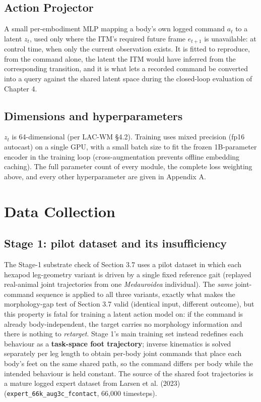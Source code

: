 \documentclass[12pt,a4paper,oneside]{report}
\begin{document}
\subsection{Action Projector}
A small per-embodiment MLP mapping a body's own logged command $a_t$ to a latent $z_t$, used only where the ITM's
required future frame $e_{t+1}$ is unavailable: at control time, when only the current observation exists. It
is fitted to reproduce, from the command alone, the latent the ITM would have inferred from the corresponding
transition, and it is what lets a recorded command be converted into a query against the shared latent space
during the closed-loop evaluation of Chapter 4.

\subsection{Dimensions and hyperparameters}
$z_t$ is 64-dimensional (per LAC-WM \S4.2). Training uses mixed precision (fp16 autocast) on a single GPU, with a
small batch size to fit the frozen 1B-parameter encoder in the training loop (cross-augmentation prevents offline
embedding caching). The full parameter count of every module, the complete loss weighting above, and every other
hyperparameter are given in Appendix A.

\section{Data Collection}

\subsection{Stage 1: pilot dataset and its insufficiency}
The Stage-1 substrate check of Section 3.7 uses a pilot dataset in which each hexapod leg-geometry variant is driven
by a single fixed reference gait (replayed real-animal joint trajectories from one \emph{Medauroidea} individual).
The \emph{same} joint-command sequence is applied to all three variants, exactly what makes the morphology-gap
test of Section 3.7 valid (identical input, different outcome), but this property is fatal for training a
latent action model on: if the command is already body-independent, the target carries no morphology information
and there is nothing to \emph{retarget}. Stage 1's main training set instead redefines each behaviour as a
\textbf{task-space foot trajectory}; inverse kinematics is solved separately per leg length to obtain
per-body joint commands that place each body's feet on the same shared path, so the command differs per body while
the intended behaviour is held constant. The source of the shared foot trajectories is a mature logged expert
dataset from Larsen et al. (2023) (\texttt{expert\_66k\_aug3c\_fcontact}, 66{,}000 timesteps).
\end{document}

